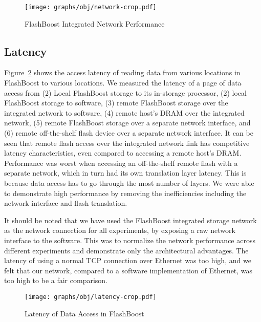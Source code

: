 \begin{figure}[h]
	\begin{center}
	\texttt{[image: graphs/obj/network-crop.pdf]}
	\caption{FlashBoost Integrated Network Performance}
	\label{fig:result_network}
	\end{center}
\end{figure}

\subsection{Latency}

Figure~\ref{fig:result_latency} shows the access latency of reading data from
various locations in FlashBoost to various locations. We measured the latency of
a page of data access from (2) Local FlashBoost storage to its in-storage
processor, (2) local FlashBoost storage to software, (3) remote FlashBoost
storage over the integrated network to software, (4) remote host's DRAM over the integrated
network, (5) remote FlashBoost storage over a separate network interface, and
(6) remote off-the-shelf flash device over a separate network interface. It
can be seen that remote flash access over the integrated network link has
competitive latency characteristics, even compared to accessing a remote host's
DRAM. Performance was worst when accessing an off-the-shelf remote flash with a separate
network, which in turn had its own translation layer latency. This is because
data access has to go through the most number of layers. We were able to
demonstrate high performance by removing the inefficiencies including the
network interface and flash translation.

It should be noted that we have used the FlashBoost integrated storage network
as the network connection for all experiments, by exposing a raw network
interface to the software. This was to normalize the network performance across
different experiments and demonstrate only the architectural advantages. The
latency of using a normal TCP connection over Ethernet was too high, and we felt
that our network, compared to a software implementation of Ethernet, was too
high to be a fair comparison.

\begin{figure}[h]
	\begin{center}
	\texttt{[image: graphs/obj/latency-crop.pdf]}
	\caption{Latency of Data Access in FlashBoost}
	\label{fig:result_latency}
	\end{center}
\end{figure}
%
%


